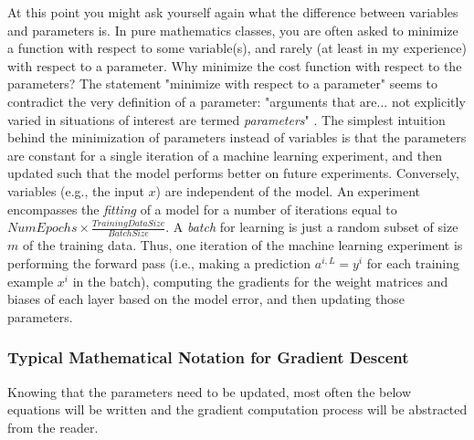 \documentclass{article}
\begin{document}
\quad At this point you might ask yourself again what the difference between
variables and parameters is. In pure mathematics classes, you are often asked
to minimize a function with respect to some variable(s), and rarely (at least in
my experience) with respect to a parameter. Why minimize the cost
function with respect to the parameters? The statement "minimize with respect
to a parameter" seems to contradict the very definition of a parameter:
"arguments that are... not explicitly varied in situations of interest are termed
\textit{parameters}" \cite{WolframMathWorldParameterDefinition}. The simplest intuition
behind the minimization of parameters instead of variables
is that the parameters are constant for a single iteration
of a machine learning experiment, and then updated such that the model performs
better on future experiments. Conversely, variables (e.g., the input $x$) are
independent of the model. An experiment encompasses the \textit{fitting} of a
model for a number of iterations equal to
$NumEpochs \times \frac{TrainingDataSize}{BatchSize}$. A \textit{batch} for learning
is just a random subset of size $m$ of the training data. Thus, one iteration of the
machine learning experiment is performing the forward pass (i.e., making a prediction
$a^{i, L} = y^{i}$ for each training example $x^{i}$ in the batch),
computing the gradients for the weight matrices and biases of each layer based on the
model error, and then updating those parameters.

\subsubsection{Typical Mathematical Notation for Gradient Descent}

\quad Knowing that the parameters need to be updated, most often the below equations
will be written and the gradient computation process will be abstracted from
the reader.
\end{document}
